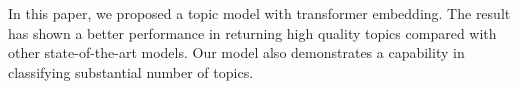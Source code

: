 In this paper, we proposed a topic model with transformer embedding. The result has shown a better performance in returning high quality topics compared with other state-of-the-art models. Our model also demonstrates a capability in classifying substantial number of topics.